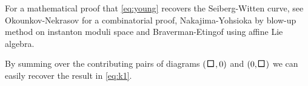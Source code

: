 \documentclass{article}
\begin{document}
For a mathematical proof that \eqref{eq:young} recovers the Seiberg-Witten curve, see Okounkov-Nekrasov \cite{Okounkov:2006wj} for a combinatorial proof, Nakajima-Yohsioka \cite{Nakajima:2003pg} by blow-up method on instanton moduli space and Braverman-Etingof \cite{Braverman:2004cr} using affine Lie algebra.

By summing over the contributing pairs of diagrams $(\,\tikzset{every picture/.style={line width=0.75pt}}\begin{tikzpicture}[x=0.75pt,y=0.75pt,yscale=-1,xscale=1]\draw   (20.67,21.67) -- (29.83,21.67) -- (29.83,30.83) -- (20.67,30.83) -- cycle ;\end{tikzpicture}\,,0)$ and $(0,\tikzset{every picture/.style={line width=0.75pt}}\begin{tikzpicture}[x=0.75pt,y=0.75pt,yscale=-1,xscale=1]\draw   (20.67,21.67) -- (29.83,21.67) -- (29.83,30.83) -- (20.67,30.83) -- cycle ;\end{tikzpicture}\,)$ we can easily recover the result in \eqref{eq:k1}.
\end{document}
